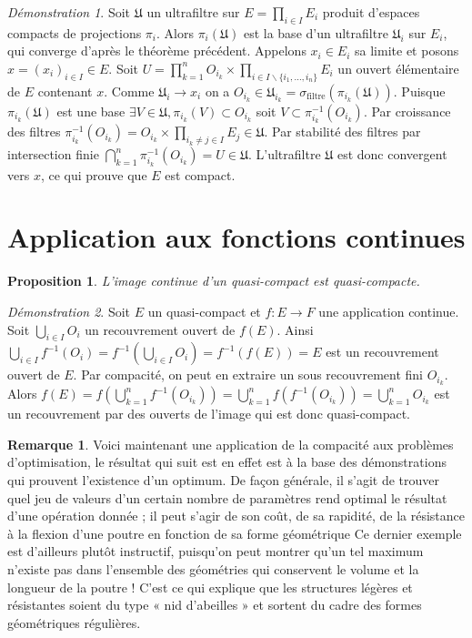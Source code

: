\documentclass[a4paper, 11pt, french]{book}
\theoremstyle{plain} %
\newtheorem{proposition}{Proposition}
\theoremstyle{definition} %
\newtheorem{remarque}{Remarque}
\theoremstyle{remark} %
\newtheorem*{demonstration}{Démonstration}
\renewcommand{\setminus}{\backslash}
\newcommand{\1}{\mathds{1}}
\newcommand{\inv}[1]{#1^{-1}}
\renewcommand{\frak}[1]{\mathfrak{#1}}
\begin{document}
\begin{demonstration}
	Soit $\frak{U}$ un ultrafiltre sur $E=\prod_{i\in I}E_i$ produit d'espaces compacts de projections $\pi_i$.
	Alors $\pi_i(\frak{U})$ est la base d'un ultrafiltre $\frak{U}_i$ sur $E_i$, qui converge d'après le théorème précédent.
	Appelons $x_i\in E_i$ sa limite et posons $x=(x_i)_{i\in I}\in E$.
	Soit $U=\prod_{k=1}^nO_{i_k}\times\prod_{i\in I\setminus\{i_1, ..., i_n\}}E_i$ un ouvert élémentaire de $E$ contenant $x$.
	Comme $\frak{U}_i\rightarrow x_i$ on a $O_{i_k}\in\frak{U}_{i_k}=\sigma_\text{filtre}(\pi_{i_k}(\frak{U}))$.
	Puisque $\pi_{i_k}(\frak{U})$ est une base $\exists V\in\frak{U}, \pi_{i_k}(V)\subset O_{i_k}$ soit $V\subset\inv{\pi_{i_k}}(O_{i_k})$.
	Par croissance des filtres $\inv{\pi_{i_k}}(O_{i_k})=O_{i_k}\times\prod_{i_k\neq j\in I}E_j\in\frak{U}$.
	Par stabilité des filtres par intersection finie $\bigcap_{k=1}^n\inv{\pi_{i_k}}(O_{i_k})=U\in\frak{U}$.
	L’ultrafiltre $\frak{U}$ est donc convergent vers $x$, ce qui prouve que $E$ est compact.
\end{demonstration}

\section{Application aux fonctions continues}

\begin{proposition}
	L’image continue d’un quasi-compact est quasi-compacte.
\end{proposition}

\begin{demonstration}
	Soit $E$ un quasi-compact et $f:E\rightarrow F$ une application continue.
	Soit $\bigcup_{i\in I}O_i$ un recouvrement ouvert de $f(E)$.
	Ainsi $\bigcup_{i\in I}\inv{f}(O_i)=\inv{f}(\bigcup_{i\in I}O_i)=\inv{f}(f(E))=E$ est un recouvrement ouvert de $E$.
	Par compacité, on peut en extraire un sous recouvrement fini $O_{i_k}$.
	Alors $f(E)=f(\bigcup_{k=1}^n\inv{f}(O_{i_k}))=\bigcup_{k=1}^nf(\inv{f}(O_{i_k}))=\bigcup_{k=1}^nO_{i_k}$ est un recouvrement par des ouverts de l'image qui est donc quasi-compact.
\end{demonstration}

\begin{remarque}
	Voici maintenant une application de la compacité aux problèmes d’optimisation, le résultat qui suit est en effet est à la base des démonstrations qui prouvent l’existence d’un optimum.
	De façon générale, il s’agit de trouver quel jeu de valeurs d’un certain nombre de paramètres rend optimal le résultat d’une opération donnée ; il peut s’agir de son coût, de sa rapidité, de la résistance à la flexion d’une poutre en fonction de sa forme géométrique Ce dernier exemple est d’ailleurs plutôt instructif, puisqu’on peut montrer qu’un tel maximum n’existe pas dans l’ensemble des géométries qui conservent le volume et la longueur de la poutre !
	C’est ce qui explique que les structures légères et résistantes soient du type « nid d’abeilles » et sortent du cadre des formes géométriques régulières.
\end{remarque}
\end{document}
